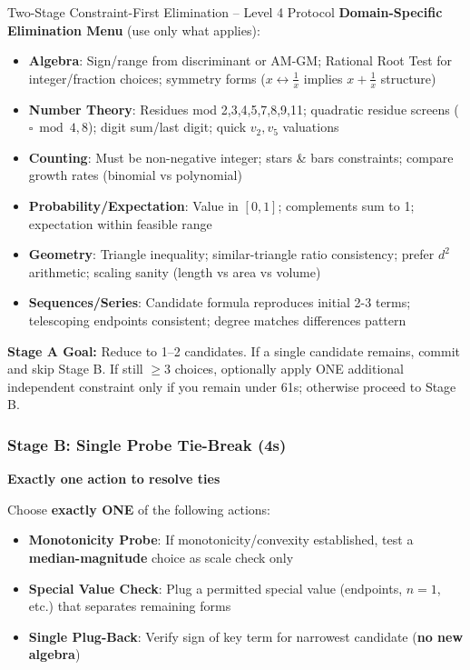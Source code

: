 \documentclass{article}
\begin{document}
\begin{classifybox}{Two-Stage Constraint-First Elimination -- Level 4 Protocol}
\textbf{Domain-Specific Elimination Menu} (use only what applies):
\begin{itemize}[nosep]
\item \textbf{Algebra}: Sign/range from discriminant or AM-GM; Rational Root Test for integer/fraction choices; symmetry forms ($x \leftrightarrow \frac{1}{x}$ implies $x+\frac{1}{x}$ structure)
\item \textbf{Number Theory}: Residues mod 2,3,4,5,7,8,9,11; quadratic residue screens ($\square \bmod 4,8$); digit sum/last digit; quick $v_2,v_5$ valuations
\item \textbf{Counting}: Must be non-negative integer; stars \& bars constraints; compare growth rates (binomial vs polynomial)
\item \textbf{Probability/Expectation}: Value in $[0,1]$; complements sum to 1; expectation within feasible range
\item \textbf{Geometry}: Triangle inequality; similar-triangle ratio consistency; prefer $d^2$ arithmetic; scaling sanity (length vs area vs volume)
\item \textbf{Sequences/Series}: Candidate formula reproduces initial 2-3 terms; telescoping endpoints consistent; degree matches differences pattern
\end{itemize}

\textbf{Stage A Goal:} Reduce to 1--2 candidates. If a single candidate remains, commit and skip Stage B. If still $\geq 3$ choices, optionally apply ONE additional independent constraint only if you remain under 61s; otherwise proceed to Stage B.

\subsubsection{Stage B: Single Probe Tie-Break (4s)}
{\footnotesize\textcolor{timegreen}{}}\quad\textbf{Exactly one action to resolve ties}

Choose \textbf{exactly ONE} of the following actions:

\begin{itemize}[nosep]
\item \textbf{Monotonicity Probe}: If monotonicity/convexity established, test a \textbf{median-magnitude} choice as scale check only
\item \textbf{Special Value Check}: Plug a permitted special value (endpoints, $n=1$, etc.) that separates remaining forms
\item \textbf{Single Plug-Back}: Verify sign of key term for narrowest candidate (\textbf{no new algebra})
\end{itemize}


\end{classifybox}
\end{document}
